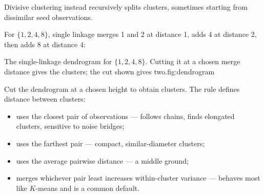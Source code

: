 Divisive clustering instead recursively splits clusters, sometimes starting from dissimilar seed observations.

\begin{workedexample}
For $\{1,2,4,8\}$, single linkage merges 1 and 2 at distance 1, adds 4 at distance 2, then adds 8 at distance 4:
\end{workedexample}

\begin{utpfig}[A dendrogram]{The single-linkage dendrogram for $\{1,2,4,8\}$. Cutting it at a chosen merge distance gives the clusters; the cut shown gives two.}{fig:dendrogram}
\end{utpfig}

Cut the dendrogram at a chosen height to obtain clusters. The  rule defines distance between clusters:

\begin{itemize}
  \item {} uses the closest pair of observations --- follows chains, finds elongated clusters, sensitive to noise bridges;
  \item {} uses the farthest pair --- compact, similar-diameter clusters;
  \item {} uses the average pairwise distance --- a middle ground;
  \item {} merges whichever pair least increases within-cluster variance --- behaves most like $K$-means and is a common default.
\end{itemize}

